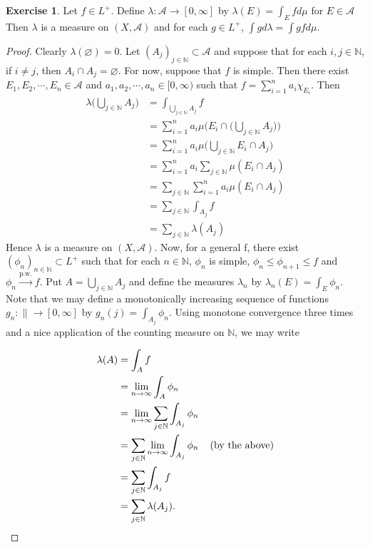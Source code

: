 \documentclass[12pt]{amsart}
\theoremstyle{definition}
\newtheorem{ex}[definition]{Exercise}
\newcommand{\lam}{\lambda}
\newcommand{\N}{\mathbb{N}}
\newcommand{\MA}{\mathcal{A}}
\newcommand{\RG}{[0,\infty]}
\newcommand{\Rg}{[0,\infty)}
\newcommand{\limn}{\lim \limits_{n \rightarrow \infty}}
\begin{document}
	\begin{ex}
		Let $f \in L^+$. Define $\lam: \MA \rightarrow \RG$ by $\lam(E) = \int_E f d\mu$ for $E \in \MA$
		Then $\lam$ is a measure on $(X, \MA)$ and for each $g \in L^+$, $\int g d\lam = \int g f d\mu$.
	\end{ex}
	
	\begin{proof}
		Clearly $\lam(\varnothing) = 0$. Let $(A_j)_{j \in \N} \subset \MA$ and suppose that for each $i, j \in \N$, if $i \neq j$, then $A_i \cap A_j = \varnothing$. For now, suppose that $f$ is simple. Then there exist $E_1, E_2, \cdots, E_n \in \MA$ and  $a_1, a_2, \cdots, a_n \in \Rg$ such that $f = \sum\limits_{i=1}^n a_i \chi_{E_i}$.  Then 
		\begin{align*}
			\lam\bigg(\bigcup_{j \in \N} A_j\bigg) 
			&= \int_{\bigcup_{j \in \N} A_j} f\\
			&= \sum_{i = 1} ^n a_i\mu\bigg(E_i \cap \bigg(\bigcup_{j \in \N} A_j\bigg)\bigg)\\
			&= \sum_{i = 1} ^n a_i\mu\bigg(\bigcup_{j \in \N} E_i \cap A_j\bigg)\\
			&= \sum_{i = 1} ^n a_i \sum_{j \in \N} \mu(E_i \cap A_j)\\
			&= \sum_{j \in \N} \sum_{i = 1} ^n a_i \mu(E_i \cap A_j)\\
			&= \sum_{j \in \N} \int_{A_j} f\\
			&= \sum_{j \in \N} \lam(A_j)
		\end{align*} 
		Hence $\lam$ is a measure on $(X, \MA)$. Now, for a general f, there exist $(\phi_n)_{n \in \N} \subset L^+$ such that for each $n \in \N$, $\phi_n$ is simple, $\phi_n \leq \phi_{n+1} \leq f$ and $\phi_n \xrightarrow{\text{p.w.}} f$. Put $A = \bigcup_{j \in \N}A_j$ and define the measures $\lam_n$ by $\lam_n(E) = \int_E \phi_n$. Note that we may define a monotonically increasing sequence of functions $g_n: \|\rightarrow \RG$ by $g_n(j) = \int_{A_j} \phi_n$. Using monotone convergence three times and a nice application of the counting measure on $\N$, we may write
		
		\begin{align*}
			\lam(A) 
			&= \int_A f\\
			&= \limn \int_A \phi_n\\
			&= \limn \sum_{j \in \N} \int_{A_j} \phi_n\\
			&= \sum_{j \in \N} \limn \int_{A_j} \phi_n \hspace{4mm} \text{(by the above)}\\
			&= \sum_{j \in \N} \int_{A_j} f\\
			&= \sum_{j \in \N} \lam(A_j).
		\end{align*} 
		

\end{proof}
\end{document}
